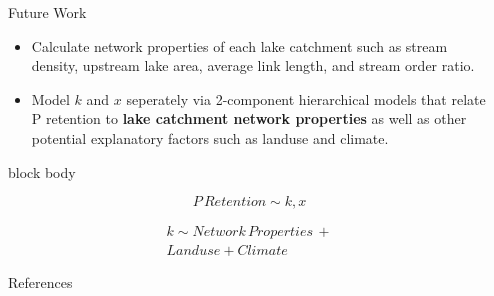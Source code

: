 \documentclass[final,hyperref={pdfpagelabels=false}]{beamer}
\begin{document}
\begin{frame}[t]
\begin{columns}[t]
\begin{column}{.465\textwidth}



\begin{block}{Future Work}

\begin{itemize}
\item Calculate network properties of each lake catchment such as stream density, upstream lake area, average link length, and stream order ratio.
\vspace{1em}
\item Model $k$ and $x$ seperately via 2-component hierarchical models that relate P retention to \textbf{lake catchment network properties} as well as other potential explanatory factors such as landuse and climate.
\end{itemize}
\end{block}

{
\begin{beamercolorbox}[wd=\textwidth,rounded=true]{block body}

\begin{equation*}
P\, Retention \sim k, x
\end{equation*}

\begin{equation*}
\begin{split}
k \sim Network\, Properties\, + \\ Landuse + Climate
\end{split}
\end{equation*}

\end{beamercolorbox}
}



\begin{block}{References}
        
\nocite{*} %
\small{
}

\end{block}


\end{column} %

\begin{column}{.015\textwidth}\end{column} %

\end{columns} %

\end{frame} %
\end{document}
